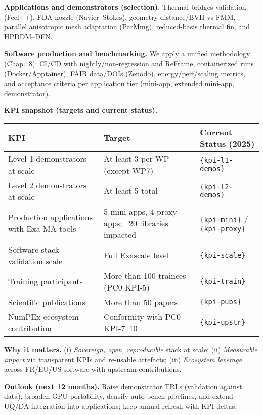 \medskip
\noindent
\textbf{Applications and demonstrators (selection).}
Thermal bridges validation (Feel++), FDA nozzle (Navier–Stokes), geometry distance/BVH vs FMM,
parallel anisotropic mesh adaptation (ParMmg), reduced-basis thermal fin, and HPDDM–DFN. %

\medskip
\noindent
\textbf{Software production and benchmarking.}
We apply a unified methodology (Chap.~8): CI/CD with nightly/non-regression and ReFrame,
containerized runs (Docker/Apptainer), FAIR data/DOIs (Zenodo), energy/perf/scaling metrics,
and acceptance criteria per application tier (mini-app, extended mini-app, demonstrator). %

\medskip
\noindent
\textbf{KPI snapshot (targets and current status).}
\begin{center}
\begin{tabular}{l p{6cm} p{4cm}}
\toprule
\textbf{KPI} & \textbf{Target} & \textbf{Current Status (2025)} \\
\midrule
Level 1 demonstrators at scale & At least 3 per WP (except WP7) & \texttt{\{kpi-l1-demos\}} \\
Level 2 demonstrators at scale & At least 5 total & \texttt{\{kpi-l2-demos\}} \\
Production applications with Exa-MA tools & 5 mini-apps, 4 proxy apps; ~20 libraries impacted & \texttt{\{kpi-mini\}} / \texttt{\{kpi-proxy\}} \\
Software stack validation scale & Full Exascale level & \texttt{\{kpi-scale\}} \\
Training participants & More than 100 trainees (PC0 KPI-5) & \texttt{\{kpi-train\}} \\
Scientific publications & More than 50 papers & \texttt{\{kpi-pubs\}} \\
NumPEx ecosystem contribution & Conformity with PC0 KPI-7--10 & \texttt{\{kpi-upstr\}} \\
\bottomrule
\end{tabular}
\end{center}

\medskip
\noindent
\textbf{Why it matters.} (i) \emph{Sovereign, open, reproducible} stack at scale; (ii) \emph{Measurable
impact} via transparent KPIs and re-usable artefacts; (iii) \emph{Ecosystem leverage} across FR/EU/US
software with upstream contributions.

\medskip
\noindent
\textbf{Outlook (next 12 months).}
Raise demonstrator TRLs (validation against data), broaden GPU portability, densify auto-bench
pipelines, and extend UQ/DA integration into applications; keep annual refresh with KPI deltas.


